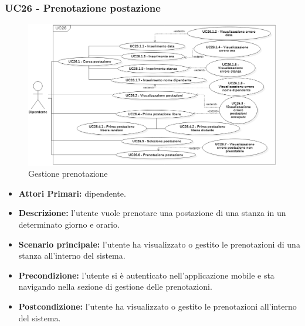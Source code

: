 \subsubsection{ UC26 - Prenotazione postazione }
\begin{figure}[H]
	\centering
	\includegraphics[width=18cm]{res/images/UC26.png}
	\caption{Gestione prenotazione}
	\label{fig:Gestione prenotazione}
\end{figure}
\begin{itemize}
	\item\textbf{Attori Primari:} dipendente.
	\item\textbf{Descrizione:} l’utente vuole prenotare una postazione di una stanza in un determinato giorno e orario.
	\item\textbf{Scenario principale:} l’utente ha visualizzato o gestito le prenotazioni di una stanza all’interno del sistema.
	\item\textbf{Precondizione:} l’utente si è autenticato nell'applicazione mobile e sta navigando nella sezione di gestione delle prenotazioni.
	\item\textbf{Postcondizione:} l’utente ha visualizzato o gestito le prenotazioni all’interno del sistema.
\end{itemize}
